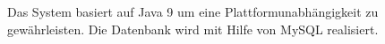 \documentclass[../../Pflichtenheft.tex]{subfiles}
\begin{document}
    Das System basiert auf Java 9 um eine Plattformunabhängigkeit zu gewährleisten.
    Die Datenbank wird mit Hilfe von MySQL realisiert.
\end{document}
